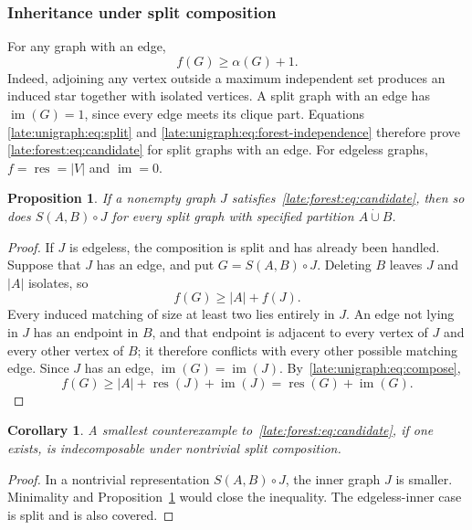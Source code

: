\documentclass[11pt,a4paper]{article}
\newtheorem{proposition}[theorem]{Proposition}
\newtheorem{corollary}[theorem]{Corollary}
\theoremstyle{definition}\newtheorem{definition}[theorem]{Definition}
\theoremstyle{remark}\newtheorem{remark}[theorem]{Remark}
\newcommand{\res}{\operatorname{res}}
\newcommand{\im}{\operatorname{im}}
\begin{document}
\subsubsection{Inheritance under split composition}

For any graph with an edge,
\begin{equation}\label{late:unigraph:eq:forest-independence}
f(G)\ge \alpha(G)+1.
\end{equation}
Indeed, adjoining any vertex outside a maximum independent set produces
an induced star together with isolated vertices. A split graph with an
edge has $\im(G)=1$, since every edge meets its clique part. Equations
\eqref{late:unigraph:eq:split} and \eqref{late:unigraph:eq:forest-independence} therefore prove
\eqref{late:forest:eq:candidate} for split graphs with an edge. For edgeless graphs,
$f=\res=|V|$ and $\im=0$.

\begin{proposition}\label{late:unigraph:prop:inherit}
If a nonempty graph $J$ satisfies~\eqref{late:forest:eq:candidate}, then so does
$S(A,B)\circ J$ for every split graph with specified partition $A\mathbin{\dot\cup} B$.
\end{proposition}
\begin{proof}
If $J$ is edgeless, the composition is split and has already been handled.
Suppose that $J$ has an edge, and put $G=S(A,B)\circ J$. Deleting $B$
leaves $J$ and $|A|$ isolates, so
\[
f(G)\ge |A|+f(J).
\]
Every induced matching of size at least two lies entirely in $J$.
An edge not lying in $J$ has an endpoint in $B$, and that endpoint is
adjacent to every vertex of $J$ and every other vertex of $B$; it therefore
conflicts with every other possible matching edge. Since $J$ has an edge,
$\im(G)=\im(J)$. By~\eqref{late:unigraph:eq:compose},
\[
f(G)\ge |A|+\res(J)+\im(J)=\res(G)+\im(G).
\]
\end{proof}

\begin{corollary}\label{late:unigraph:cor:indecomp}
A smallest counterexample to~\eqref{late:forest:eq:candidate}, if one exists, is
indecomposable under nontrivial split composition.
\end{corollary}
\begin{proof}
In a nontrivial representation $S(A,B)\circ J$, the inner graph $J$ is
smaller. Minimality and Proposition~\ref{late:unigraph:prop:inherit} would close the
inequality. The edgeless-inner case is split and is also covered.
\end{proof}
\end{document}
